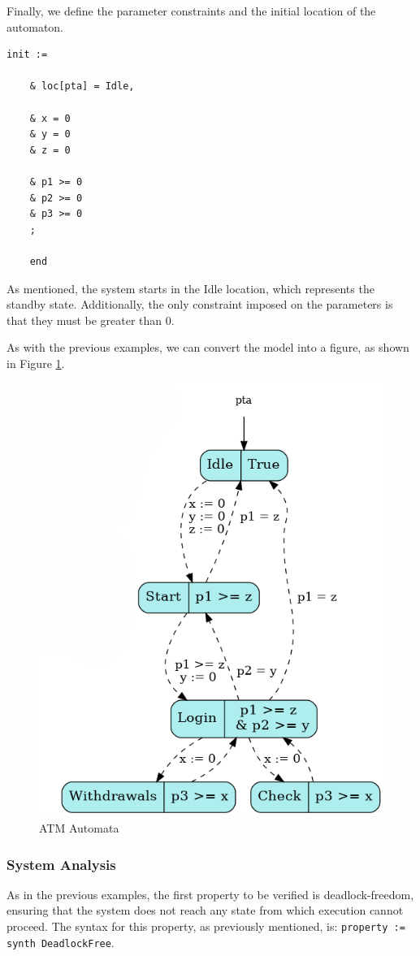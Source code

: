 Finally, we define the parameter constraints and the initial location of the automaton.

\begin{lstlisting}[language=UPPAAL]
    init := 

    & loc[pta] = Idle,
    
    & x = 0
    & y = 0
    & z = 0

    & p1 >= 0
    & p2 >= 0
    & p3 >= 0
    ;

    end
\end{lstlisting}


As mentioned, the system starts in the Idle location, which represents the standby state. Additionally, the only constraint imposed on the parameters is that they must be greater than 0.

As with the previous examples, we can convert the model into a figure, as shown in Figure \ref{fig:ATM_output}.


\begin{figure} [H]
    \centering
    \includegraphics[width=0.6\linewidth]{images/fixed.png}
    \caption[ATM Automata]{ATM Automata}
    \label{fig:ATM_output}
\end{figure}

\subsubsection{System Analysis}

As in the previous examples, the first property to be verified is deadlock-freedom, ensuring that the system does not reach any state from which execution cannot proceed. The syntax for this property, as previously mentioned, is: \texttt{property := synth DeadlockFree}.

